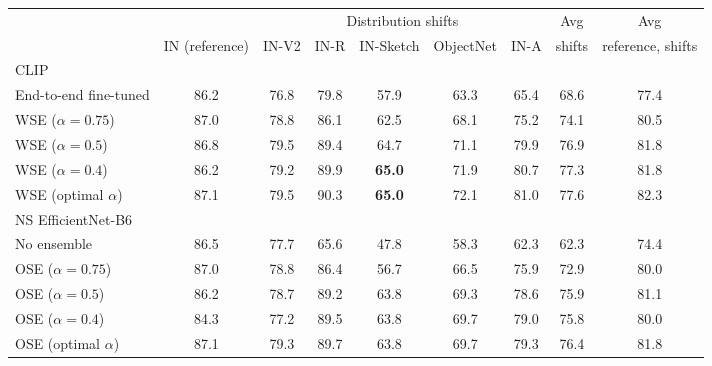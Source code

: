 \begin{table}
\setlength\tabcolsep{3.2pt}
\small
\begin{center}
\begin{tabular}{lc|ccccc|cc}
\toprule
{} &            &             \multicolumn{5}{c|}{Distribution shifts}             & Avg &     Avg\\
{} &           IN (reference) &             IN-V2 &              IN-R &                 IN-Sketch &                 ObjectNet &              IN-A & shifts &     reference, shifts\\
\midrule
CLIP &            &  & & & &  &  & \\
\quad End-to-end fine-tuned                 &           86.2 &           76.8 &           79.8 &           57.9 &           63.3 &           65.4 &           68.6 &           77.4 \\  
\quad WSE ($\alpha{=}0.75$)     &           87.0 &           78.8 &           86.1 &           62.5 &           68.1 &           75.2 &           74.1 &           80.5 \\             
\quad WSE ($\alpha{=}0.5$)      &           86.8 &           79.5 &           89.4 &           64.7 &           71.1 &           79.9 &           76.9 &           81.8 \\             
\quad WSE ($\alpha{=}0.4$)      &           86.2 &           79.2 &           89.9 &  \textbf{65.0} &           71.9 &           80.7 &           77.3 &           81.8 \\             
\quad WSE (optimal $\alpha$)    &           87.1 &           79.5 &           90.3 &  \textbf{65.0} &           72.1 &           81.0 &           77.6 &           82.3 \\               
NS EfficientNet-B6  &            &  & & & &  &  & \\
\quad No ensemble      &           86.5 &           77.7 &           65.6 &           47.8 &           58.3 &           62.3 &           62.3 &           74.4 \\  
\quad OSE ($\alpha{=}0.75$)  &           87.0 &           78.8 &           86.4 &           56.7 &           66.5 &           75.9 &           72.9 &           80.0 \\                
\quad OSE ($\alpha{=}0.5$)   &           86.2 &           78.7 &           89.2 &           63.8 &           69.3 &           78.6 &           75.9 &           81.1 \\                
\quad OSE ($\alpha{=}0.4$)   &           84.3 &           77.2 &           89.5 &           63.8 &           69.7 &           79.0 &           75.8 &           80.0 \\                
\quad OSE (optimal $\alpha$) &           87.1 &           79.3 &           89.7 &           63.8 &           69.7 &           79.3 &           76.4 &           81.8 \\                 


\end{tabular}
\end{center}
\end{table}

